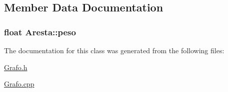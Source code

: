 \subsection{Member Data Documentation}
\hypertarget{class_aresta_a5cbe0615f1b11fc59b24743c751c7c89}{
\subsubsection[{peso}]{\setlength{\rightskip}{0pt plus 5cm}float Aresta\-::peso}}\label{class_aresta_a5cbe0615f1b11fc59b24743c751c7c89}


The documentation for this class was generated from the following files\-:\begin{DoxyCompactItemize}
\item 
\hyperlink{_grafo_8h}{Grafo.\-h}\item 
\hyperlink{_grafo_8cpp}{Grafo.\-cpp}\end{DoxyCompactItemize}
